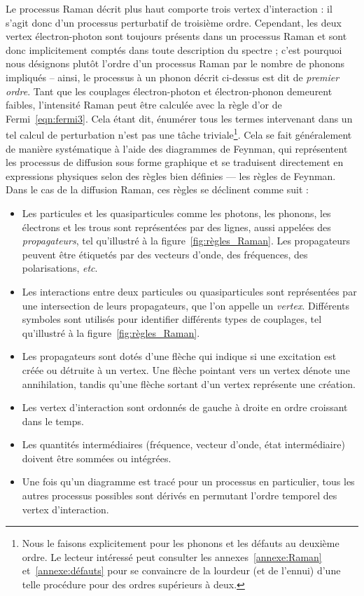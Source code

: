 Le processus Raman décrit plus haut comporte trois vertex d'interaction : il s'agit donc d'un processus perturbatif de troisième ordre. Cependant, les deux vertex électron-photon sont toujours présents dans un processus Raman et sont donc implicitement comptés dans toute description du spectre ; c'est pourquoi nous désignons plutôt l'ordre d'un processus Raman par le nombre de phonons impliqués -- ainsi, le processus à un phonon décrit ci-dessus est dit de \textit{premier ordre}. Tant que les couplages électron-photon et électron-phonon demeurent faibles, l'intensité Raman peut être calculée avec la règle d'or de Fermi~\eqref{eqn:fermi3}. Cela étant dit, énumérer tous les termes intervenant dans un tel calcul de perturbation n'est pas une tâche triviale\footnote{Nous le faisons explicitement pour les phonons et les défauts au deuxième ordre. Le lecteur intéressé peut consulter les annexes~\ref{annexe:Raman} et~\ref{annexe:défauts} pour se convaincre de la lourdeur (et de l'ennui) d'une telle procédure pour des ordres supérieurs à deux.}. Cela se fait généralement de manière systématique à l'aide des diagrammes de Feynman, qui représentent les processus de diffusion sous forme graphique et se traduisent directement en expressions physiques selon des règles bien définies --- les règles de Feynman. Dans le cas de la diffusion Raman, ces règles se déclinent comme suit :
\begin{itemize}
    \item Les particules et les quasiparticules comme les photons, les phonons, les électrons et les trous sont représentées par des lignes, aussi appelées des \textit{propagateurs}, tel qu'illustré à la figure~\ref{fig:règles_Raman}. Les propagateurs peuvent être étiquetés par des vecteurs d'onde, des fréquences, des polarisations, \textit{etc}.
    \item Les interactions entre deux particules ou quasiparticules sont représentées par une intersection de leurs propagateurs, que l'on appelle un \textit{vertex}. Différents symboles sont utilisés pour identifier différents types de couplages, tel qu'illustré à la figure~\ref{fig:règles_Raman}.
    \item Les propagateurs sont dotés d'une flèche qui indique si une excitation est créée ou détruite à un vertex. Une flèche pointant vers un vertex dénote une annihilation, tandis qu'une flèche sortant d'un vertex représente une création.
    \item Les vertex d'interaction sont ordonnés de gauche à droite en ordre croissant dans le temps.
    \item Les quantités intermédiaires (fréquence, vecteur d'onde, état intermédiaire) doivent être sommées ou intégrées.
    \item Une fois qu'un diagramme est tracé pour un processus en particulier, tous les autres processus possibles sont dérivés en permutant l'ordre temporel des vertex d'interaction.
\end{itemize}
